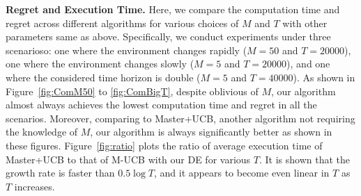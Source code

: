 \documentclass[twoside]{article}
\theoremstyle{plain}
\theoremstyle{definition}
\theoremstyle{remark}
\begin{document}
\textbf{Regret and Execution Time.} Here, we compare the computation time and regret across different algorithms for various choices of $M$ and $T$ with other parameters same as above. Specifically, we conduct experiments under three scenarioso: one where the environment changes rapidly ($M=50$ and $T=20000$), one where the environment changes slowly ($M=5$ and $T=20000$), and one where the considered time horizon is double ($M=5$ and $T=40000$). As shown in Figure~\ref{fig:ComM50} to \ref{fig:ComBigT}, despite oblivious of $M$, our algorithm almost always achieves the lowest computation time and regret in all the scenarios. Moreover, comparing to Master+UCB, another algorithm not requiring the knowledge of $M$, our algorithm is always significantly better as shown in these figures. Figure~\ref{fig:ratio} plots the ratio of average execution time of Master+UCB to that of M-UCB with our DE for various $T$. It is shown that the growth rate is faster than $0.5 \log T$, and it appears to become even linear in $T$ as $T$ increases.
\end{document}
